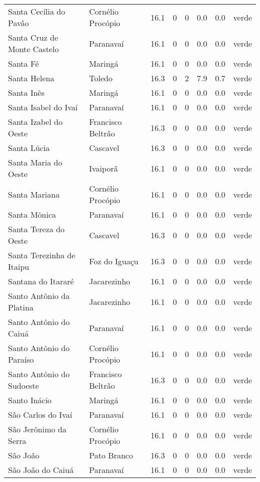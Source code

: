 \begin{longtable}{l|lllllll}
  Santa Cecília do Pavão & Cornélio Procópio & 16.1 & 0 & 0 & 0.0 & 0.0 & verde \\ 
  Santa Cruz de Monte Castelo & Paranavaí & 16.1 & 0 & 0 & 0.0 & 0.0 & verde \\ 
  Santa Fé & Maringá & 16.1 & 0 & 0 & 0.0 & 0.0 & verde \\ 
  Santa Helena & Toledo & 16.3 & 0 & 2 & 7.9 & 0.7 & verde \\ 
  Santa Inês & Maringá & 16.1 & 0 & 0 & 0.0 & 0.0 & verde \\ 
  Santa Isabel do Ivaí & Paranavaí & 16.1 & 0 & 0 & 0.0 & 0.0 & verde \\ 
  Santa Izabel do Oeste & Francisco Beltrão & 16.3 & 0 & 0 & 0.0 & 0.0 & verde \\ 
  Santa Lúcia & Cascavel & 16.3 & 0 & 0 & 0.0 & 0.0 & verde \\ 
  Santa Maria do Oeste & Ivaiporã & 16.1 & 0 & 0 & 0.0 & 0.0 & verde \\ 
  Santa Mariana & Cornélio Procópio & 16.1 & 0 & 0 & 0.0 & 0.0 & verde \\ 
  Santa Mônica & Paranavaí & 16.1 & 0 & 0 & 0.0 & 0.0 & verde \\ 
  Santa Tereza do Oeste & Cascavel & 16.3 & 0 & 0 & 0.0 & 0.0 & verde \\ 
  Santa Terezinha de Itaipu & Foz do Iguaçu & 16.3 & 0 & 0 & 0.0 & 0.0 & verde \\ 
  Santana do Itararé & Jacarezinho & 16.1 & 0 & 0 & 0.0 & 0.0 & verde \\ 
  Santo Antônio da Platina & Jacarezinho & 16.1 & 0 & 0 & 0.0 & 0.0 & verde \\ 
  Santo Antônio do Caiuá & Paranavaí & 16.1 & 0 & 0 & 0.0 & 0.0 & verde \\ 
  Santo Antônio do Paraíso & Cornélio Procópio & 16.1 & 0 & 0 & 0.0 & 0.0 & verde \\ 
  Santo Antônio do Sudoeste & Francisco Beltrão & 16.3 & 0 & 0 & 0.0 & 0.0 & verde \\ 
  Santo Inácio & Maringá & 16.1 & 0 & 0 & 0.0 & 0.0 & verde \\ 
  São Carlos do Ivaí & Paranavaí & 16.1 & 0 & 0 & 0.0 & 0.0 & verde \\ 
  São Jerônimo da Serra & Cornélio Procópio & 16.1 & 0 & 0 & 0.0 & 0.0 & verde \\ 
  São João & Pato Branco & 16.3 & 0 & 0 & 0.0 & 0.0 & verde \\ 
  São João do Caiuá & Paranavaí & 16.1 & 0 & 0 & 0.0 & 0.0 & verde \\ 

\end{longtable}
